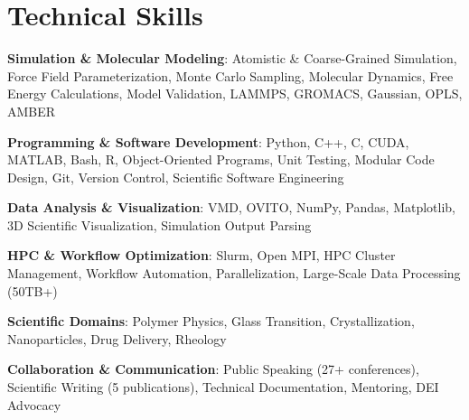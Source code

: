 \section*{Technical Skills}
\begin{tabitemize}
  \item \textbf{Simulation \& Molecular Modeling}: Atomistic \& Coarse-Grained Simulation, Force Field Parameterization, Monte Carlo Sampling, Molecular Dynamics, Free Energy Calculations, Model Validation, LAMMPS, GROMACS, Gaussian, OPLS, AMBER
  \item \textbf{Programming \& Software Development}: Python, C++, C, CUDA, MATLAB, Bash, R, Object-Oriented Programs, Unit Testing, Modular Code Design, Git, Version Control, Scientific Software Engineering
  \item \textbf{Data Analysis \& Visualization}: VMD, OVITO, NumPy, Pandas, Matplotlib, 3D Scientific Visualization, Simulation Output Parsing
  \item \textbf{HPC \& Workflow Optimization}: Slurm, Open MPI, HPC Cluster Management, Workflow Automation, Parallelization, Large-Scale Data Processing (50TB+)
  \item \textbf{Scientific Domains}: Polymer Physics, Glass Transition, Crystallization, Nanoparticles, Drug Delivery, Rheology
  \item \textbf{Collaboration \& Communication}: Public Speaking (27+ conferences), Scientific Writing (5 publications), Technical Documentation, Mentoring, DEI Advocacy
\end{tabitemize}

